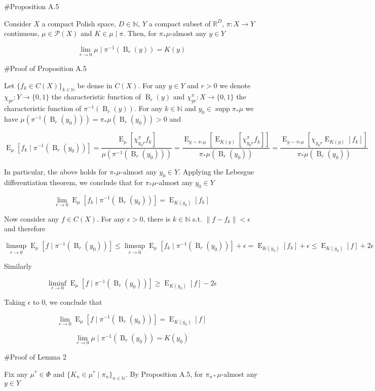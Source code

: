 \documentclass[a4paper]{article}
\newcommand{\Bool}{\{0,1\}}
\DeclareMathOperator{\Supp}{supp}
\DeclareMathOperator{\E}{E}
\newcommand{\Nats}{\mathbb{N}}
\newcommand{\Reals}{\mathbb{R}}
\newcommand{\Sq}[2]{\{#1\}_{#2 \in \Nats}}
\newcommand{\Sqn}[1]{\Sq{#1}{n}}
\newcommand{\Norm}[1]{\lVert #1 \rVert}
\newcommand{\Prob}{\mathcal{P}}
\newcommand{\Ball}{\operatorname{B}}
\begin{document}
\#Proposition A.5

Consider $X$ a compact Polish space, $D \in \Nats$, $Y$ a compact subset of $\Reals^D$, $\pi: X \rightarrow Y$ continuous, $\mu \in \Prob(X)$ and $K \in \mu \mid \pi$. Then, for $\pi_* \mu$-almost any $y \in Y$

$$\lim_{r \rightarrow 0} \mu \mid \pi^{-1}(\Ball_r(y)) = K(y)$$

\#Proof of Proposition A.5

Let $\Sq{f_k \in C(X)}{k}$ be dense in $C(X)$. For any $y \in Y$ and $r > 0$ we denote $\chi_{yr}: Y \rightarrow \Bool$ the characteristic function of $\Ball_r(y)$ and $\chi^\pi_{yr}: X \rightarrow \Bool$ the characteristic function of $\pi^{-1}(\Ball_r(y))$. For any $k \in \Nats$ and $y_0 \in \Supp \pi_* \mu$ we have $\mu(\pi^{-1}(\Ball_r(y_0))) = \pi_*\mu(\Ball_r(y_0)) > 0$ and

$$\E_{\mu}[f_k \mid \pi^{-1}(\Ball_r(y_0))] = \frac{\E_{\mu}[\chi^\pi_{y_0r} f_k]}{\mu(\pi^{-1}(\Ball_r(y_0)))} = \frac{\E_{y \sim \pi_* \mu}[\E_{K(y)}[\chi^\pi_{y_0r} f_k]]}{\pi_*\mu(\Ball_r(y_0))} = \frac{\E_{y \sim \pi_* \mu}[\chi_{y_0r} \E_{K(y)}[f_k]]}{\pi_*\mu(\Ball_r(y_0))}$$

In particular, the above holds for $\pi_* \mu$-almost any $y_0 \in Y$. Applying the Lebesgue differentiation theorem, we conclude that for $\pi_* \mu$-almost any $y_0 \in Y$

$$\lim_{r \rightarrow 0} \E_{\mu}[f_k \mid \pi^{-1}(\Ball_r(y_0))] = \E_{K(y_0)}[f_k]$$

Now consider any $f \in C(X)$. For any $\epsilon > 0$, there is $k \in \Nats$ s.t. $\Norm{f-f_k} < \epsilon$ and therefore

$$\limsup_{r \rightarrow 0} \E_{\mu}[f \mid \pi^{-1}(\Ball_r(y_0))] \leq \limsup_{r \rightarrow 0} \E_{\mu}[f_k \mid \pi^{-1}(\Ball_r(y_0))] + \epsilon = \E_{K(y_0)}[f_k] + \epsilon  \leq \E_{K(y_0)}[f] + 2\epsilon$$

Similarly

$$\liminf_{r \rightarrow 0} \E_{\mu}[f \mid \pi^{-1}(\Ball_r(y_0))] \geq \E_{K(y_0)}[f] - 2\epsilon$$

Taking $\epsilon$ to 0, we conclude that

$$\lim_{r \rightarrow 0} \E_{\mu}[f \mid \pi^{-1}(\Ball_r(y_0))] = \E_{K(y_0)}[f]$$

$$\lim_{r \rightarrow 0} \mu \mid \pi^{-1}(\Ball_r(y_0)) = K(y_0)$$

\#Proof of Lemma 2

Fix any $\mu^* \in \Phi$ and $\Sqn{K_n \in \mu^* \mid \pi_n}$. By Proposition A.5, for $\pi_{n*} \mu$-almost any $y \in Y$
\end{document}
